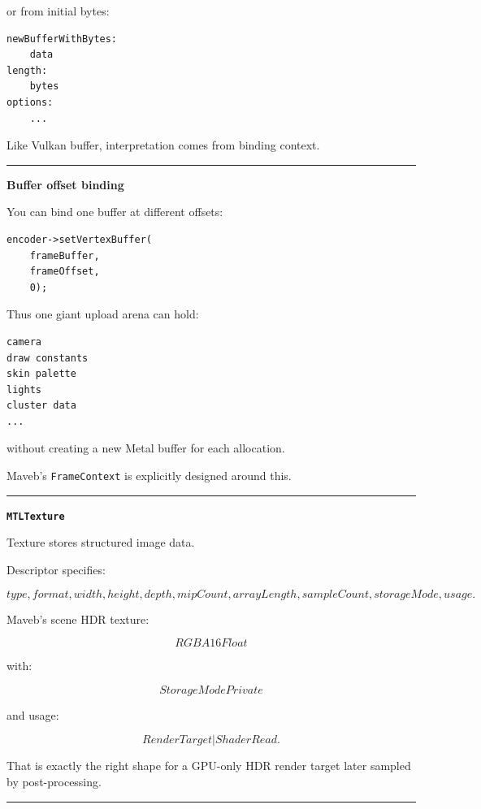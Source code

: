 or from initial bytes:

\begin{verbatim}
newBufferWithBytes:
    data
length:
    bytes
options:
    ...
\end{verbatim}

Like Vulkan buffer, interpretation comes from binding context.

\begin{center}\rule{0.5\linewidth}{0.5pt}\end{center}

\textbf{Buffer offset binding}

You can bind one buffer at different offsets:

\begin{verbatim}
encoder->setVertexBuffer(
    frameBuffer,
    frameOffset,
    0);
\end{verbatim}

Thus one giant upload arena can hold:

\begin{verbatim}
camera
draw constants
skin palette
lights
cluster data
...
\end{verbatim}

without creating a new Metal buffer for each allocation.

Maveb's \texttt{FrameContext} is explicitly designed around this.

\begin{center}\rule{0.5\linewidth}{0.5pt}\end{center}

\textbf{\texttt{MTLTexture}}

Texture stores structured image data.

Descriptor specifies:

\[
type,
format,
width,
height,
depth,
mipCount,
arrayLength,
sampleCount,
storageMode,
usage.
\]

Maveb's scene HDR texture:

\[
RGBA16Float
\]

with:

\[
StorageModePrivate
\]

and usage:

\[
RenderTarget
|
ShaderRead.
\]

That is exactly the right shape for a GPU-only HDR render target later sampled by post-processing.

\begin{center}\rule{0.5\linewidth}{0.5pt}\end{center}

